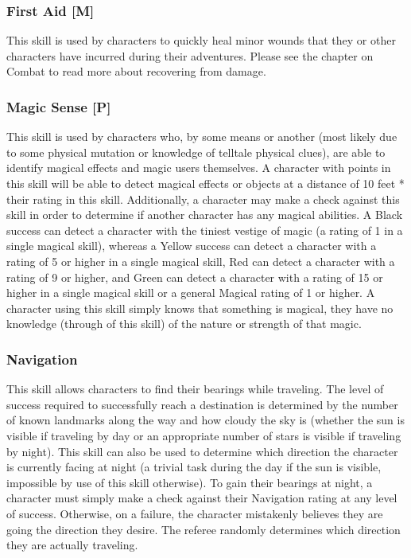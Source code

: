 \documentclass[oneside]{book}
\begin{document}
\begin{multicols}{2}
\subsubsection{First Aid [M]}
This skill is used by characters to quickly heal minor wounds that they or other characters have incurred during their adventures. Please see the chapter on Combat to read more about recovering from damage.

\subsubsection{Magic Sense [P]}
This skill is used by characters who, by some means or another (most likely due to some physical mutation or knowledge of telltale physical clues), are able to identify magical effects and magic users themselves. A character with points in this skill will be able to detect magical effects or objects at a distance of 10 feet * their rating in this skill. Additionally, a character may make a check against this skill in order to determine if another character has any magical abilities. A Black success can detect a character with the tiniest vestige of magic (a rating of 1 in a single magical skill), whereas a Yellow success can detect a character with a rating of 5 or higher in a single magical skill, Red can detect a character with a rating of 9 or higher, and Green  can detect a character with a rating of 15 or higher in a single magical skill or a general Magical rating of 1 or higher. A character using this skill simply knows that something is magical, they have no knowledge (through of this skill) of the nature or strength of that magic. 

\subsubsection{Navigation}
This skill allows characters to find their bearings while traveling. The level of success required to successfully reach a destination is determined by the number of known landmarks along the way and how cloudy the sky is (whether the sun is visible if traveling by day or an appropriate number of stars is visible if traveling by night). This skill can also be used to determine which direction the character is currently facing at night (a trivial task during the day if the sun is visible, impossible by use of this skill otherwise). To gain their bearings at night, a character must simply make a check against their Navigation rating at any level of success. Otherwise, on a failure, the character mistakenly believes they are going the direction they desire. The referee randomly determines which direction they are actually traveling.


\end{multicols}
\end{document}
